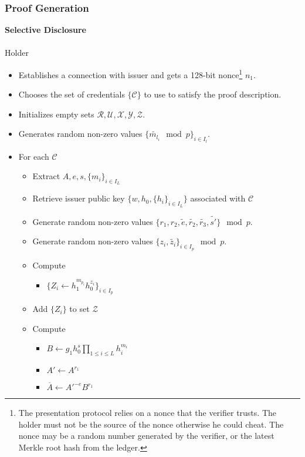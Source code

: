 \documentclass[a4paper]{article}
\begin{document}
\subsubsection{Proof Generation}
\textbf{Selective Disclosure}\\\\
Holder
\begin{itemize}
    \item Establishes a connection with issuer and gets a 128-bit nonce\footnote{The presentation protocol relies on a nonce that the verifier trusts. The holder must not be the source of the nonce otherwise he could cheat. The nonce may be a random number generated by the verifier, or the latest Merkle root hash from the ledger.} $n_1$.
    \item Chooses the set of credentials $\{\mathcal{C}\}$ to use to satisfy the proof description.
    \item Initializes empty sets $\mathcal{R}, \mathcal{U}, \mathcal{X}, \mathcal{Y}, \mathcal{Z}$.
    \item Generates random non-zero values $\{\widetilde{m_{l_i}} \mod p\}_{i \in I_l}$.
    \item For each $\mathcal{C}$
    \begin{itemize}
        \item Extract $A, e, s, \{m_i\}_{i \in I_L}$
        \item Retrieve issuer public key $\{w, h_0, \{h_i\}_{i \in I_L}\}$ associated with $\mathcal{C}$
        \item Generate random non-zero values $\{r_1,r_2,\widetilde{e},\widetilde{r_2},\widetilde{r_3},\widetilde{s'}\} \mod p$.
        \item Generate random non-zero values $\{z_i,\widetilde{z_i}\}_{i\in I_p} \mod p$.
        \item Compute 
            \begin{itemize}
                \item $\{Z_i \leftarrow h_1^{m_{p_i}}h_0^{z_i}\}_{i\in I_p}$
            \end{itemize}
        \item Add $\{Z_i\}$ to set $\mathcal{Z}$
        \item Compute 
            \begin{itemize}
                \item $B \leftarrow g_1  h_0^{s}\prod_{1\leq i\leq L} h_i^{m_i}$
                \item $A'\leftarrow A^{r_1}$
                \item $\overline{A}\leftarrow A'^{-e}B^{r_1}$

\end{itemize}
\end{itemize}
\end{itemize}
\end{document}
